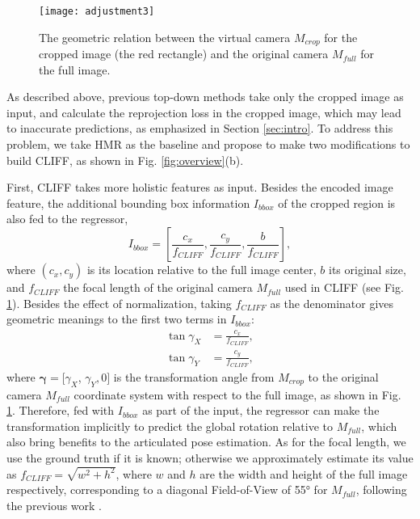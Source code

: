 \documentclass[runningheads]{llncs}
\begin{document}
\begin{figure}[t]
	\centering
	\texttt{[image: adjustment3]}
	\caption {The geometric relation between the virtual camera $M_{crop}$ for the cropped image (the red rectangle) and the original camera $M_{full}$ for the full image.}
	\label{fig:adjust}
\end{figure}

As described above, previous top-down methods take only the cropped image as input, and calculate the reprojection loss in the cropped image, which may lead to inaccurate predictions, as emphasized in Section \ref{sec:intro}.
To address this problem, we take HMR as the baseline and propose to make two modifications to build CLIFF, as shown in Fig. \ref{fig:overview}(b).

First, CLIFF takes more holistic features as input.
Besides the encoded image feature, the additional bounding box information $I_{bbox}$ of the cropped region is also fed to the regressor,
\begin{equation}
I_{bbox} = [\frac{c_x}{f_{CLIFF}}, \frac{c_y}{f_{CLIFF}}, \frac{b}{f_{CLIFF}}],
\end{equation}
where $(c_x, c_y)$ is its location relative to the full image center, $b$ its original size, and $f_{CLIFF}$ the focal length of the original camera $M_{full}$ used in CLIFF (see Fig. \ref{fig:adjust}).
Besides the effect of normalization, taking $f_{CLIFF}$ as the denominator gives geometric meanings to the first two terms in $I_{bbox}$:
\begin{equation}\begin{aligned}
\tan \gamma_X & = \frac{c_x}{f_{CLIFF}}, \\
\tan \gamma_Y & = \frac{c_y}{f_{CLIFF}},
\end{aligned}\end{equation}
where $\bm{\gamma} = [\gamma_X$, $\gamma_Y, 0]$ is the transformation angle from $M_{crop}$ to the original camera $M_{full}$ coordinate system with respect to the full image, as shown in Fig. \ref{fig:adjust}.
Therefore, fed with $I_{bbox}$ as part of the input, the regressor can make the transformation implicitly to predict the global rotation relative to $M_{full}$, which also bring benefits to the articulated pose estimation.
As for the focal length, we use the ground truth if it is known; otherwise we approximately estimate its value as $f_{CLIFF} = \sqrt{w^2 + h^2}$, where $w$ and $h$ are the width and height of the full image respectively, corresponding to a diagonal Field-of-View of 55° for $M_{full}$, following the previous work \cite{kissos2020beyond}.
\end{document}
